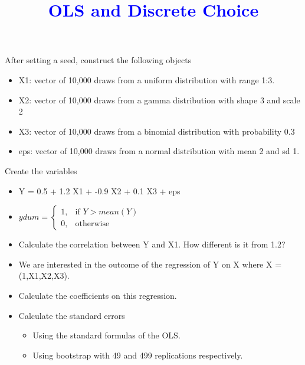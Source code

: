 \documentclass[10pt,a4paper]{article}
\newcommand{\1}{\mathds{1}}
\begin{document}
\doublespacing

\title{\textcolor{blue}{OLS and Discrete Choice}}
\maketitle


\begin{Exercise}[title=Data creation]
After setting a seed, construct the following objects
\begin{itemize}
\item X1: vector of 10,000 draws from a uniform distribution with range 1:3.
\item X2: vector of 10,000 draws from a gamma distribution with shape 3 and scale 2
\item X3: vector of 10,000 draws from a binomial distribution with probability 0.3
\item eps: vector of 10,000 draws from a normal distribution with mean 2 and sd 1.
\end{itemize}
Create the variables 
\begin{itemize}
\item Y = 0.5 + 1.2 X1 + -0.9 X2 + 0.1 X3 + eps
\item $ydum = \begin{cases} 1, & \mbox{if } Y>mean(Y) \\ 0, & \mbox{otherwise } \end{cases}$
\end{itemize}
\end{Exercise}

\begin{Exercise}[title=OLS]
\begin{itemize}
\item Calculate the correlation between Y and X1. How different is it from 1.2?
\item We are interested in the outcome of the regression of Y on X where X = (1,X1,X2,X3).
\item Calculate the coefficients on this regression.
\item Calculate the standard errors
\begin{itemize}
\item Using the standard formulas of the OLS.
\item Using bootstrap with 49 and 499 replications respectively.
\end{itemize}
\end{itemize}
\end{Exercise}
\end{document}
